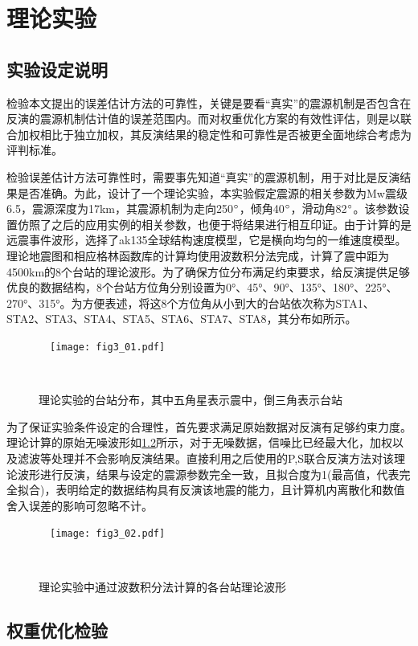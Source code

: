 

\chapter{理论实验}

\section{实验设定说明}
检验本文提出的误差估计方法的可靠性，关键是要看“真实”的震源机制是否包含在反演的震源机制估计值的误差范围内。而对权重优化方案的有效性评估，则是以联合加权相比于独立加权，其反演结果的稳定性和可靠性是否被更全面地综合考虑为评判标准。

检验误差估计方法可靠性时，需要事先知道“真实”的震源机制，用于对比是反演结果是否准确。为此，设计了一个理论实验，本实验假定震源的相关参数为Mw震级6.5，震源深度为17km，其震源机制为走向250$^\circ$，倾角40$^\circ$，滑动角82$^\circ$。该参数设置仿照了之后的应用实例的相关参数，也便于将结果进行相互印证。由于计算的是远震事件波形，选择了ak135全球结构速度模型\citep{Kennett1995}，它是横向均匀的一维速度模型。理论地震图和相应格林函数库的计算均使用波数积分法完成，计算了震中距为4500km的8个台站的理论波形。为了确保方位分布满足约束要求，给反演提供足够优良的数据结构，8个台站方位角分别设置为0°、45°、90°、135°、180°、225°、270°、315°。为方便表述，将这8个方位角从小到大的台站依次称为STA1、STA2、STA3、STA4、STA5、STA6、STA7、STA8，其分布如所示。
\begin{figure}
\centering
  \texttt{[image: fig3\_01.pdf]}
  \caption{理论实验的台站分布，其中五角星表示震中，倒三角表示台站}
  \label{fig3_01}
\end{figure}

为了保证实验条件设定的合理性，首先要求满足原始数据对反演有足够约束力度。理论计算的原始无噪波形如\ref{fig3_02}所示，对于无噪数据，信噪比已经最大化，加权以及滤波等处理并不会影响反演结果。直接利用之后使用的P,S联合反演方法对该理论波形进行反演，结果与设定的震源参数完全一致，且拟合度为1(最高值，代表完全拟合)，表明给定的数据结构具有反演该地震的能力，且计算机内离散化和数值舍入误差的影响可忽略不计。
\begin{figure}
\centering
  \texttt{[image: fig3\_02.pdf]}
  \caption{理论实验中通过波数积分法计算的各台站理论波形}
  \label{fig3_02}
\end{figure}

\section{权重优化检验}

